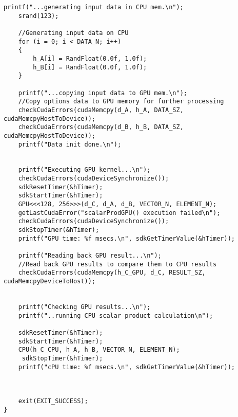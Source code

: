 \begin{lstlisting}[frame=single]
    printf("...generating input data in CPU mem.\n");
    srand(123);

    //Generating input data on CPU
    for (i = 0; i < DATA_N; i++)
    {
        h_A[i] = RandFloat(0.0f, 1.0f);
        h_B[i] = RandFloat(0.0f, 1.0f);
    }

    printf("...copying input data to GPU mem.\n");
    //Copy options data to GPU memory for further processing
    checkCudaErrors(cudaMemcpy(d_A, h_A, DATA_SZ, cudaMemcpyHostToDevice));
    checkCudaErrors(cudaMemcpy(d_B, h_B, DATA_SZ, cudaMemcpyHostToDevice));
    printf("Data init done.\n");


    printf("Executing GPU kernel...\n");
    checkCudaErrors(cudaDeviceSynchronize());
    sdkResetTimer(&hTimer);
    sdkStartTimer(&hTimer);
    GPU<<<128, 256>>>(d_C, d_A, d_B, VECTOR_N, ELEMENT_N);
    getLastCudaError("scalarProdGPU() execution failed\n");
    checkCudaErrors(cudaDeviceSynchronize());
    sdkStopTimer(&hTimer);
    printf("GPU time: %f msecs.\n", sdkGetTimerValue(&hTimer));

    printf("Reading back GPU result...\n");
    //Read back GPU results to compare them to CPU results
    checkCudaErrors(cudaMemcpy(h_C_GPU, d_C, RESULT_SZ, cudaMemcpyDeviceToHost));


    printf("Checking GPU results...\n");
    printf("..running CPU scalar product calculation\n");

	sdkResetTimer(&hTimer);
    sdkStartTimer(&hTimer);
    CPU(h_C_CPU, h_A, h_B, VECTOR_N, ELEMENT_N);
	 sdkStopTimer(&hTimer);
    printf("cPU time: %f msecs.\n", sdkGetTimerValue(&hTimer));


    
    exit(EXIT_SUCCESS);
}
\end{lstlisting}


